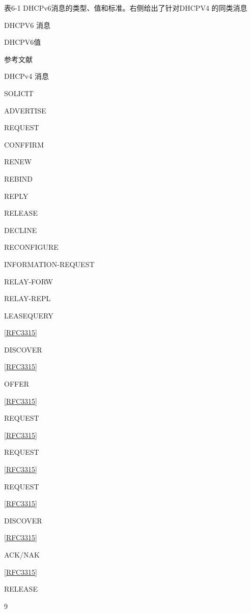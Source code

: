 表6-1 DHCPv6消息的类型、值和标准。右侧给出了针对DHCPV4 的同类消息

DHCPV6 消息

DHCPV6值

参考文献

DHCPv4 消息

SOLICIT

ADVERTISE

REQUEST

CONFFIRM

RENEW

REBIND

REPLY

RELEASE

DECLINE

RECONFIGURE

INFORMATION-REQUEST

RELAY-FORW

RELAY-REPL

LEASEQUERY

\href{https://www.rfc-editor.org/rfc/rfc3315}{\href{https://www.rfc-editor.org/rfc/rfc3315}{[RFC3315]}}

DISCOVER

\href{https://www.rfc-editor.org/rfc/rfc3315}{\href{https://www.rfc-editor.org/rfc/rfc3315}{[RFC3315]}}

OFFER

\href{https://www.rfc-editor.org/rfc/rfc3315}{\href{https://www.rfc-editor.org/rfc/rfc3315}{[RFC3315]}}

REQUEST

\href{https://www.rfc-editor.org/rfc/rfc3315}{\href{https://www.rfc-editor.org/rfc/rfc3315}{[RFC3315]}}

REQUEST

\href{https://www.rfc-editor.org/rfc/rfc3315}{\href{https://www.rfc-editor.org/rfc/rfc3315}{[RFC3315]}}

REQUEST

\href{https://www.rfc-editor.org/rfc/rfc3315}{\href{https://www.rfc-editor.org/rfc/rfc3315}{[RFC3315]}}

DISCOVER

\href{https://www.rfc-editor.org/rfc/rfc3315}{\href{https://www.rfc-editor.org/rfc/rfc3315}{[RFC3315]}}

ACK/NAK

\href{https://www.rfc-editor.org/rfc/rfc3315}{\href{https://www.rfc-editor.org/rfc/rfc3315}{[RFC3315]}}

RELEASE

9

